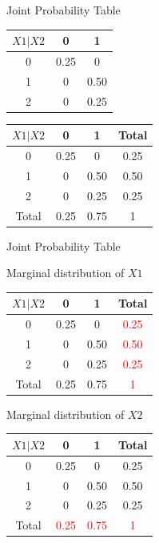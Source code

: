\documentclass{beamer}\usepackage[]{graphicx}\usepackage[]{color}
\begin{document}
\begin{frame}[fragile]{Joint Probability Table \;\;}

\begin{tabular}{|c|c|c|}
\hline
$X1|X2$ & 0 & 1 \\ \hline
0 & 0.25 & 0 \\ \hline
1 & 0 & 0.50 \\ \hline
2 & 0 & 0.25  \\ \hline
\end{tabular} \pause \newline \newline

\begin{tabular}{|c|c|c|c|}
\hline
$X1|X2$ & 0 & 1 & Total\\ \hline
0 & 0.25 & 0 & 0.25 \\ \hline
1 & 0 & 0.50 & 0.50\\ \hline
2 & 0 & 0.25 & 0.25\\ \hline
Total & 0.25 & 0.75 & 1 \\ \hline
\end{tabular}

\end{frame}

\begin{frame}[fragile]{Joint Probability Table \;\;}

Marginal distribution of $X1$

\begin{tabular}{|c|c|c|c|}
$X1|X2$ & 0 & 1 & Total\\ \hline
0 & 0.25 & 0 & \textcolor{red}{0.25} \\ \hline
1 & 0 & 0.50 & \textcolor{red}{0.50}\\ \hline
2 & 0 & 0.25 & \textcolor{red}{0.25}\\ \hline
Total & 0.25 & 0.75 & \textcolor{red}{1} \\ \hline
\end{tabular} \pause \newline

Marginal distribution of $X2$ \pause \newline

\begin{tabular}{|c|c|c|c|}
\hline
$X1|X2$ & 0 & 1 & Total\\ \hline
0 & 0.25 & 0 & 0.25 \\ \hline
1 & 0 & 0.50 & 0.50\\ \hline
2 & 0 & 0.25 & 0.25\\ \hline
Total & \textcolor{red}{0.25} & \textcolor{red}{0.75} & \textcolor{red}{1} \\ \hline
\end{tabular}

\end{frame}
\end{document}
